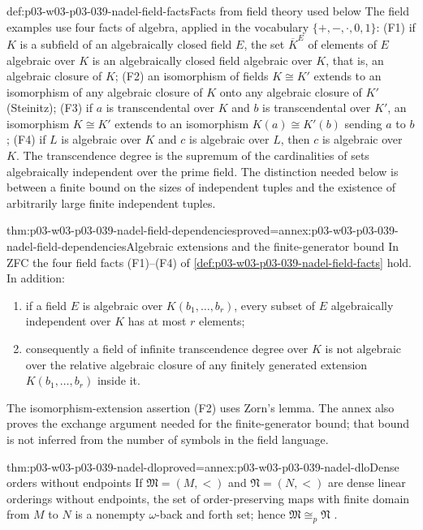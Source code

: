 \begin{hbconvention}{def:p03-w03-p03-039-nadel-field-facts}{Facts from field theory used below}
The field examples use four facts of algebra, applied in the vocabulary
\(\{+,-,\cdot,0,1\}\): (F1) if \(K\) is a subfield of an algebraically closed
field \(E\), the set \(\overline K^E\) of elements of \(E\) algebraic over
\(K\) is an algebraically closed field algebraic over \(K\), that is, an
algebraic closure of \(K\); (F2) an isomorphism of fields \(K\cong K'\)
extends to an isomorphism of any algebraic closure of \(K\) onto any
algebraic closure of \(K'\) (Steinitz); (F3) if \(a\) is transcendental over
\(K\) and \(b\) is transcendental over \(K'\), an isomorphism \(K\cong K'\)
extends to an isomorphism \(K(a)\cong K'(b)\) sending \(a\) to \(b\); (F4)
if \(L\) is algebraic over \(K\) and \(c\) is algebraic over \(L\), then \(c\)
is algebraic over \(K\). The
transcendence degree is the supremum of the cardinalities of sets
algebraically independent over the prime field. The distinction needed
below is between a finite bound on the sizes of independent tuples and
the existence of arbitrarily large finite independent tuples.
\end{hbconvention}

\begin{hblemma}{thm:p03-w03-p03-039-nadel-field-dependencies}{proved=annex:p03-w03-p03-039-nadel-field-dependencies}{Algebraic extensions and the finite-generator bound}
In ZFC the four field facts (F1)--(F4) of
\cref{def:p03-w03-p03-039-nadel-field-facts} hold. In addition:
\begin{enumerate}
\item if a field \(E\) is algebraic over \(K(b_1,\ldots,b_r)\),
      every subset of \(E\) algebraically independent over \(K\) has
      at most \(r\) elements;
\item consequently a field of infinite transcendence degree over \(K\)
      is not algebraic over the relative algebraic closure of any
      finitely generated extension \(K(b_1,\ldots,b_r)\) inside it.
\end{enumerate}
The isomorphism-extension assertion (F2) uses Zorn's lemma. The annex
also proves the exchange argument needed for the finite-generator bound;
that bound is not inferred from the number of symbols in the field
language.
\end{hblemma}

\begin{hbtheorem}{thm:p03-w03-p03-039-nadel-dlo}{proved=annex:p03-w03-p03-039-nadel-dlo}{Dense orders without endpoints}
If \(\mathfrak M=(M,<)\) and \(\mathfrak N=(N,<)\) are dense linear orderings
without endpoints, the set of order-preserving maps with finite domain
from \(M\) to \(N\) is a nonempty \(\omega\)-back and forth set; hence
\(\mathfrak M\cong_p\mathfrak N\)
\cite[p.~277]{Nadel1985Admissible}.
\end{hbtheorem}

